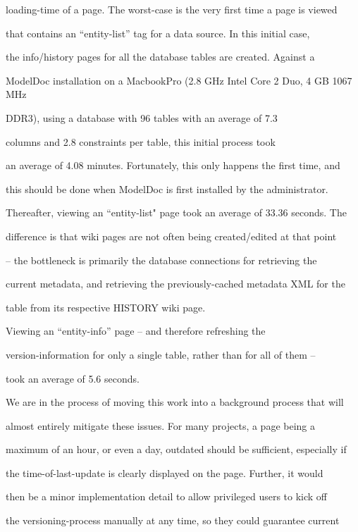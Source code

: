 \documentclass{acm_proc_article-sp}
\begin{document}
loading-time of a page.  The worst-case is the very first time a page is viewed

that contains an ``entity-list'' tag for a data source.  In this initial case,

the info/history pages for all the database tables are created.  Against a

ModelDoc installation on a MacbookPro (2.8 GHz Intel Core 2 Duo, 4 GB 1067 MHz

DDR3), using a database with 96 tables with an average of 7.3

columns and 2.8 constraints per table, this initial process took

an average of 4.08 minutes.  Fortunately, this only happens the first time, and

this should be done when ModelDoc is first installed by the administrator.



Thereafter, viewing an ``entity-list" page took an average of 33.36 seconds. The

difference is that wiki pages are not often being created/edited at that point

-- the bottleneck is primarily the database connections for retrieving the

current metadata, and retrieving the previously-cached metadata XML for the

table from its respective HISTORY wiki page.



Viewing an ``entity-info'' page -- and therefore refreshing the

version-information for only a single table, rather than for all of them --

took an average of 5.6 seconds.



We are in the process of moving this work into a background process that will

almost entirely mitigate these issues.  For many projects, a page being a

maximum of an hour, or even a day, outdated should be sufficient, especially if

the time-of-last-update is clearly displayed on the page.  Further, it would

then be a minor implementation detail to allow privileged users to kick off

the versioning-process manually at any time, so they could guarantee current
\end{document}
